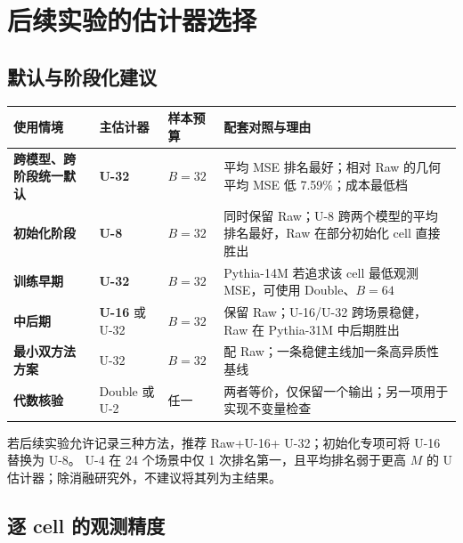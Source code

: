 \documentclass[11pt,a4paper]{ctexart}
\newcommand{\method}[1]{\textsf{#1}}
\newcommand{\best}[1]{\textcolor{positive}{\textbf{#1}}}
\begin{document}
\FloatBarrier

\section{后续实验的估计器选择}

\subsection{默认与阶段化建议}

\begin{center}
\begin{tabularx}{0.98\textwidth}{>{\bfseries}p{2.6cm}p{2.7cm}p{2.5cm}X}
  \toprule
  使用情境 & 主估计器 & 样本预算 & 配套对照与理由 \\
  \midrule
  跨模型、跨阶段统一默认 & \best{U-32} & \best{$B=32$} & 平均 MSE 排名最好；相对 Raw 的几何平均 MSE 低 7.59\%；成本最低档 \\
  初始化阶段 & \best{U-8} & $B=32$ & 同时保留 Raw；U-8 跨两个模型的平均排名最好，Raw 在部分初始化 cell 直接胜出 \\
  训练早期 & \best{U-32} & $B=32$ & Pythia-14M 若追求该 cell 最低观测 MSE，可使用 Double、$B=64$ \\
  中后期 & \best{U-16} 或 U-32 & $B=32$ & 保留 Raw；U-16/U-32 跨场景稳健，Raw 在 Pythia-31M 中后期胜出 \\
  最小双方法方案 & U-32 & $B=32$ & 配 Raw；一条稳健主线加一条高异质性基线 \\
  代数核验 & Double 或 U-2 & 任一 & 两者等价，仅保留一个输出；另一项用于实现不变量检查 \\
  \bottomrule
\end{tabularx}
\end{center}

若后续实验允许记录三种方法，推荐 \method{Raw}+\method{U-16}+
\method{U-32}；初始化专项可将 \method{U-16} 替换为 \method{U-8}。
\method{U-4} 在 24 个场景中仅 1 次排名第一，且平均排名弱于更高 $M$
的 U 估计器；除消融研究外，不建议将其列为主结果。

\subsection{逐 cell 的观测精度}
\end{document}
